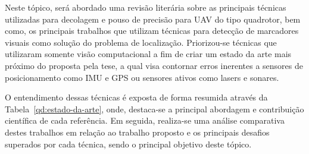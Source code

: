 


	
	Neste tópico, será abordado uma revisão literária sobre as principais técnicas utilizadas para decolagem e pouso de precisão para UAV do tipo quadrotor, bem como, os principais trabalhos que utilizam técnicas para detecção de marcadores visuais como solução do problema de localização. Priorizou-se técnicas que utilizaram somente visão computacional a fim de criar um estado da arte mais próximo do proposta pela tese, a qual visa contornar erros inerentes a sensores de posicionamento como IMU e GPS ou sensores ativos como lasers e sonares. 
	
	O entendimento dessas técnicas é exposta de forma resumida através da Tabela~\ref{qd:estado-da-arte}, onde, destaca-se a principal abordagem e contribuição científica de cada referência. Em seguida, realiza-se uma análise comparativa destes trabalhos em relação ao trabalho proposto e os principais desafios superados por cada técnica, sendo o principal objetivo deste tópico. 
	
